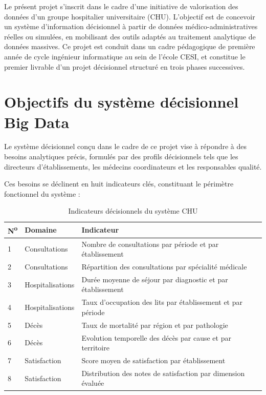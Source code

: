 \documentclass[12pt, a4paper]{report}
\begin{document}
Le présent projet s'inscrit dans le cadre d'une initiative de valorisation des données d'un groupe hospitalier universitaire (CHU). L'objectif est de concevoir un système d'information décisionnel à partir de données médico-administratives réelles ou simulées, en mobilisant des outils adaptés au traitement analytique de données massives. Ce projet est conduit dans un cadre pédagogique de première année de cycle ingénieur informatique au sein de l'école CESI, et constitue le premier livrable d'un projet décisionnel structuré en trois phases successives.

\section{Objectifs du système décisionnel Big Data}
Le système décisionnel conçu dans le cadre de ce projet vise à répondre à des besoins analytiques précis, formulés par des profils décisionnels tels que les directeurs d'établissements, les médecins coordinateurs et les responsables qualité. 

Ces besoins se déclinent en huit indicateurs clés, constituant le périmètre fonctionnel du système :

\begin{table}[H]
    \centering
    \begin{tabularx}{\textwidth}{@{}l l X@{}}
    \toprule
    \rowcolor{chuBlue!15}
    \textbf{N\textsuperscript{o}} & \textbf{Domaine} & \textbf{Indicateur} \\
    \midrule
    1 & Consultations & Nombre de consultations par période et par établissement \\
    \rowcolor{chuGray}
    2 & Consultations & Répartition des consultations par spécialité médicale \\
    3 & Hospitalisations & Durée moyenne de séjour par diagnostic et par établissement \\
    \rowcolor{chuGray}
    4 & Hospitalisations & Taux d'occupation des lits par établissement et par période \\
    5 & Décès & Taux de mortalité par région et par pathologie \\
    \rowcolor{chuGray}
    6 & Décès & Evolution temporelle des décès par cause et par territoire \\
    7 & Satisfaction & Score moyen de satisfaction par établissement \\
    \rowcolor{chuGray}
    8 & Satisfaction & Distribution des notes de satisfaction par dimension évaluée \\
    \bottomrule
    \end{tabularx}
    \caption{Indicateurs décisionnels du système CHU}
\end{table}
\end{document}
